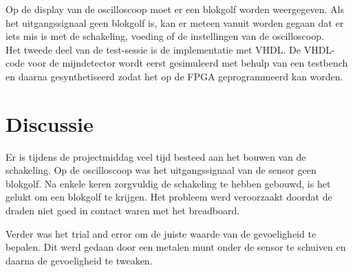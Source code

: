 \documentclass{report}
\begin{document}
Op de display van de oscilloscoop moet er een blokgolf worden weergegeven. Als het uitgangssignaal geen blokgolf is, kan er meteen vanuit worden gegaan dat er iets mis is met de schakeling, voeding of de instellingen van de oscilloscoop.\\

\noindent Het tweede deel van de test-sessie is de implementatie met VHDL. De VHDL-code voor de mijndetector wordt eerst gesimuleerd met behulp van een testbench en daarna gesynthetiseerd zodat het op de FPGA geprogrammeerd kan worden. 

\section{Discussie}
Er is tijdens de projectmiddag veel tijd besteed aan het bouwen van de schakeling. Op de oscilloscoop was het uitgangssignaal van de sensor geen blokgolf. Na enkele keren zorgvuldig de schakeling te hebben gebouwd, is het gelukt om een blokgolf te krijgen. Het probleem werd veroorzaakt doordat de draden niet goed in contact waren met het breadboard.

Verder was het trial and error om de juiste waarde van de gevoeligheid te bepalen. Dit werd gedaan door een metalen munt onder de sensor te schuiven en daarna de gevoeligheid te tweaken.
\end{document}
